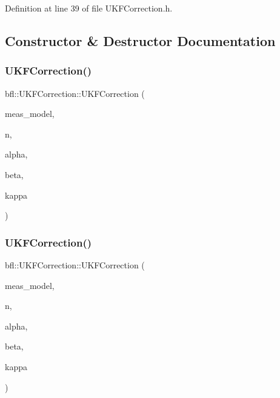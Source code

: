 Definition at line 39 of file U\+K\+F\+Correction.\+h.



\subsection{Constructor \& Destructor Documentation}
\mbox{\label{classbfl_1_1UKFCorrection_aeef18124ec4e001215cb618ebda97233}} 
\subsubsection{\texorpdfstring{U\+K\+F\+Correction()}{UKFCorrection()}\hspace{0.1cm}{\footnotesize\ttfamily [1/3]}}
{\footnotesize\ttfamily bfl\+::\+U\+K\+F\+Correction\+::\+U\+K\+F\+Correction (\begin{DoxyParamCaption}\item[{std\+::unique\+\_\+ptr$<$ \mbox{\hyperlink{classbfl_1_1MeasurementModel}{bfl\+::\+Measurement\+Model}} $>$}]{meas\+\_\+model,  }\item[{const size\+\_\+t}]{n,  }\item[{const double}]{alpha,  }\item[{const double}]{beta,  }\item[{const double}]{kappa }\end{DoxyParamCaption})\hspace{0.3cm}{\ttfamily [noexcept]}}

\mbox{\label{classbfl_1_1UKFCorrection_a7ec389a4e92efc2c9496be9222575cba}} 
\subsubsection{\texorpdfstring{U\+K\+F\+Correction()}{UKFCorrection()}\hspace{0.1cm}{\footnotesize\ttfamily [2/3]}}
{\footnotesize\ttfamily bfl\+::\+U\+K\+F\+Correction\+::\+U\+K\+F\+Correction (\begin{DoxyParamCaption}\item[{std\+::unique\+\_\+ptr$<$ \mbox{\hyperlink{classbfl_1_1AdditiveMeasurementModel}{bfl\+::\+Additive\+Measurement\+Model}} $>$}]{meas\+\_\+model,  }\item[{const size\+\_\+t}]{n,  }\item[{const double}]{alpha,  }\item[{const double}]{beta,  }\item[{const double}]{kappa }\end{DoxyParamCaption})\hspace{0.3cm}{\ttfamily [noexcept]}}

